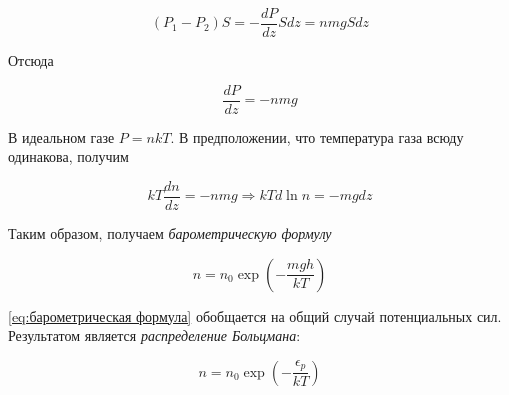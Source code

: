 \begin{equation*}
    \left( P_1 - P_2 \right) S = - \frac{dP}{dz} S dz = n m g S dz
\end{equation*}

\noindent
Отсюда

\begin{equation}
    \frac{dP}{dz} = - n m g
\end{equation}

\noindent
В идеальном газе $P = n k T$. В предположении, что температура газа всюду одинакова, получим

\begin{equation*}
    k T \frac{dn}{dz} = - n m g \Rightarrow k T d \ln n = - m g dz
\end{equation*}

\noindent
Таким образом, получаем \textit{барометрическую формулу}

\begin{equation} \label{eq:барометрическая формула}
    n = n_0 \exp \left( - \frac{m g h}{k T} \right)
\end{equation}

\noindent
\eqref{eq:барометрическая формула} обобщается на общий случай потенциальных сил. Результатом является \textit{распределение Больцмана}:

\begin{equation}
    n = n_0 \exp \left( - \frac{\epsilon_p}{k T} \right)
\end{equation}